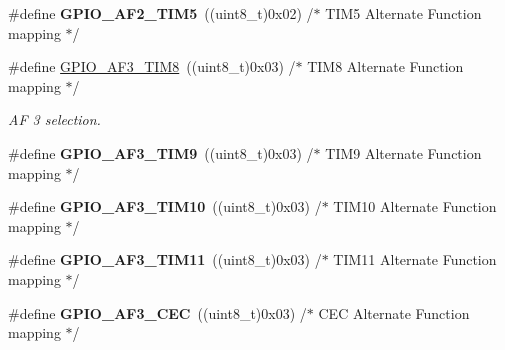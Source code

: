 \begin{DoxyCompactItemize}
\item 
\#define {\bfseries G\+P\+I\+O\+\_\+\+A\+F2\+\_\+\+T\+I\+M5}~((uint8\+\_\+t)0x02)  /$\ast$ T\+I\+M5 Alternate Function mapping $\ast$/\hypertarget{group___g_p_i_o___alternate__function__selection_ga8b122f3db7f4a483f5e268543ccf60ba}{}\label{group___g_p_i_o___alternate__function__selection_ga8b122f3db7f4a483f5e268543ccf60ba}

\item 
\#define \hyperlink{group___g_p_i_o___alternate__function__selection_gaf090cae245bfae075661c330c470c3f4}{G\+P\+I\+O\+\_\+\+A\+F3\+\_\+\+T\+I\+M8}~((uint8\+\_\+t)0x03)  /$\ast$ T\+I\+M8 Alternate Function mapping  $\ast$/\hypertarget{group___g_p_i_o___alternate__function__selection_gaf090cae245bfae075661c330c470c3f4}{}\label{group___g_p_i_o___alternate__function__selection_gaf090cae245bfae075661c330c470c3f4}

\begin{DoxyCompactList}\small\item\em AF 3 selection. \end{DoxyCompactList}\item 
\#define {\bfseries G\+P\+I\+O\+\_\+\+A\+F3\+\_\+\+T\+I\+M9}~((uint8\+\_\+t)0x03)  /$\ast$ T\+I\+M9 Alternate Function mapping  $\ast$/\hypertarget{group___g_p_i_o___alternate__function__selection_ga957c5bf2ee31ad216b6f152c5fac2b6b}{}\label{group___g_p_i_o___alternate__function__selection_ga957c5bf2ee31ad216b6f152c5fac2b6b}

\item 
\#define {\bfseries G\+P\+I\+O\+\_\+\+A\+F3\+\_\+\+T\+I\+M10}~((uint8\+\_\+t)0x03)  /$\ast$ T\+I\+M10 Alternate Function mapping $\ast$/\hypertarget{group___g_p_i_o___alternate__function__selection_ga567ff1ffeab3cb7174bece2c81249e06}{}\label{group___g_p_i_o___alternate__function__selection_ga567ff1ffeab3cb7174bece2c81249e06}

\item 
\#define {\bfseries G\+P\+I\+O\+\_\+\+A\+F3\+\_\+\+T\+I\+M11}~((uint8\+\_\+t)0x03)  /$\ast$ T\+I\+M11 Alternate Function mapping $\ast$/\hypertarget{group___g_p_i_o___alternate__function__selection_ga2530afd8e3d67fa86c19362bc5f4b86f}{}\label{group___g_p_i_o___alternate__function__selection_ga2530afd8e3d67fa86c19362bc5f4b86f}

\item 
\#define {\bfseries G\+P\+I\+O\+\_\+\+A\+F3\+\_\+\+C\+EC}~((uint8\+\_\+t)0x03)  /$\ast$ C\+E\+C Alternate Function mapping   $\ast$/\hypertarget{group___g_p_i_o___alternate__function__selection_ga118da94c0a3fc5d6409b6afaea47c366}{}\label{group___g_p_i_o___alternate__function__selection_ga118da94c0a3fc5d6409b6afaea47c366}


\end{DoxyCompactItemize}
